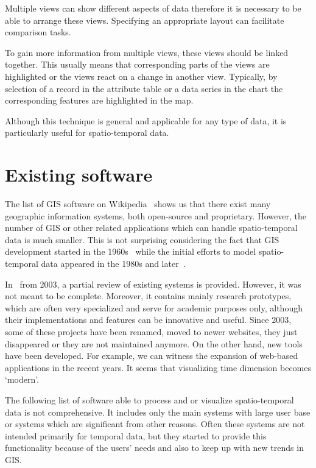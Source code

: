 \documentclass[a4paper,12pt,oneside]{book}
\begin{document}
Multiple views can show different aspects of data therefore it is necessary to be able
to arrange these views. Specifying an appropriate layout can facilitate comparison tasks.

To gain more information from multiple views, these views should be linked together.
This usually means that corresponding parts of the views are highlighted or the views
react on a change in another view. Typically, by selection of a record in the attribute table
or a data series in the chart the corresponding features are highlighted in the map.

Although this technique is general and applicable for any type of data, it is particularly
useful for spatio-temporal data.


\section{Existing software}
The list of GIS software on Wikipedia~\cite{wiki:gislist}
shows us that there exist many geographic information systems,
both open-source and proprietary.
However, the number of GIS or other related applications which can handle
spatio-temporal data is much smaller.
This is not surprising considering the fact that GIS development started
in the 1960s~\cite{coppock1991history} while the initial efforts to model spatio-temporal
data appeared in the 1980s and later~\cite{peuquet2001}.

In~\cite{andrienko2003exploratory} from 2003, a partial review of existing systems is provided.
However, it was not meant to be complete. Moreover, it contains mainly research prototypes,
which are often very specialized and serve for academic purposes only, although their implementations
and features can be innovative and useful.
Since 2003, some of these projects have been renamed,
moved to newer websites, they just disappeared or they are not maintained anymore.
On the other hand, new tools have been developed.
For example, we can witness the expansion of web-based applications in the recent years.
It seems that visualizing time dimension becomes `modern'.

The following list of software able to process and or visualize spatio-temporal data is not comprehensive.
It includes only the main systems with large user base or systems which are significant from other reasons.
Often these systems are not intended primarily for temporal data,
but they started to provide this functionality because of the users' needs
and also to keep up with new trends in GIS.
\end{document}
